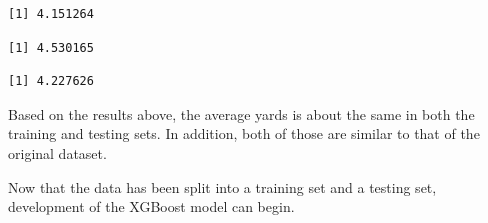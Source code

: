 \documentclass[
  super,
  preprint,
  3p]{elsarticle}
\newenvironment{Shaded}{\begin{snugshade}}{\end{snugshade}}
\newcommand{\FunctionTok}[1]{\textcolor[rgb]{0.28,0.35,0.67}{#1}}
\newcommand{\NormalTok}[1]{\textcolor[rgb]{0.00,0.23,0.31}{#1}}
\newcommand{\OtherTok}[1]{\textcolor[rgb]{0.00,0.23,0.31}{#1}}
\newcommand{\SpecialCharTok}[1]{\textcolor[rgb]{0.37,0.37,0.37}{#1}}
\begin{document}
\begin{verbatim}
[1] 4.151264
\end{verbatim}

\begin{Shaded}
\end{Shaded}

\begin{verbatim}
[1] 4.530165
\end{verbatim}

\begin{Shaded}
\end{Shaded}

\begin{verbatim}
[1] 4.227626
\end{verbatim}

Based on the results above, the average yards is about the same in both
the training and testing sets. In addition, both of those are similar to
that of the original dataset.

Now that the data has been split into a training set and a testing set,
development of the XGBoost model can begin.
\end{document}
